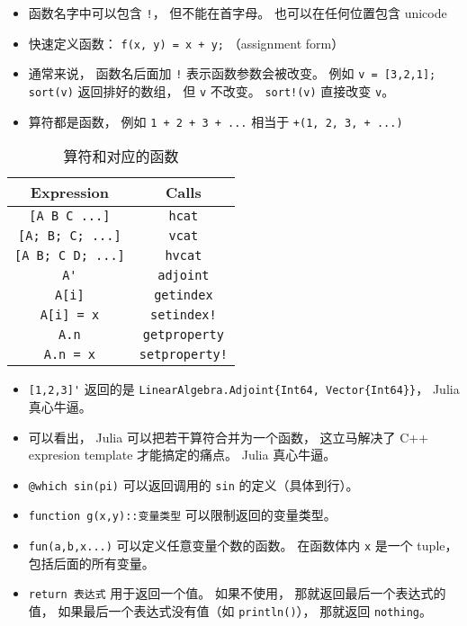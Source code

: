 
\begin{issues}
\issueDraft
\end{issues}

\begin{itemize}
\item 函数名字中可以包含 \verb|!|， 但不能在首字母。 也可以在任何位置包含 unicode
\item 快速定义函数： \verb|f(x, y) = x + y;| （assignment form）
\item 通常来说， 函数名后面加 \verb|!| 表示函数参数会被改变。 例如 \verb|v = [3,2,1]; sort(v)| 返回排好的数组， 但 \verb|v| 不改变。 \verb|sort!(v)| 直接改变 \verb|v|。
\item 算符都是函数， 例如 \verb|1 + 2 + 3 + ...| 相当于 \verb|+(1, 2, 3, + ...)|
\end{itemize}


\begin{table}[ht]
\centering
\caption{算符和对应的函数}\label{JuFunc_tab1}
\begin{tabular}{|c|c|}
\hline
Expression & Calls \\
\hline
\verb|[A B C ...]| & \verb|hcat| \\
\hline
\verb|[A; B; C; ...]| & \verb|vcat| \\
\hline
\verb|[A B; C D; ...]| & \verb|hvcat| \\
\hline
\verb|A'| & \verb|adjoint| \\
\hline
\verb|A[i]| & \verb|getindex| \\
\hline
\verb|A[i] = x| & \verb|setindex!| \\
\hline
\verb|A.n| & \verb|getproperty| \\
\hline
\verb|A.n = x| & \verb|setproperty!| \\
\hline
\end{tabular}
\end{table}

\begin{itemize}
\item \verb|[1,2,3]'| 返回的是 \verb|LinearAlgebra.Adjoint{Int64, Vector{Int64}}|， Julia 真心牛逼。
\item 可以看出， Julia 可以把若干算符合并为一个函数， 这立马解决了 C++ expresion template 才能搞定的痛点。 Julia 真心牛逼。
\item \verb|@which sin(pi)| 可以返回调用的 \verb|sin| 的定义（具体到行）。
\item \verb|function g(x,y)::变量类型| 可以限制返回的变量类型。
\item \verb|fun(a,b,x...)| 可以定义任意变量个数的函数。 在函数体内 \verb|x| 是一个 tuple， 包括后面的所有变量。
\item \verb|return 表达式| 用于返回一个值。 如果不使用， 那就返回最后一个表达式的值， 如果最后一个表达式没有值（如 \verb|println()|）， 那就返回 \verb|nothing|。
\end{itemize}

